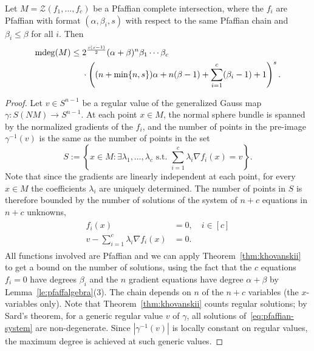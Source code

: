 \begin{proposition}\label{prop:pfaffian-degree-bound}
  Let $M=\mathcal{Z}(f_1,\dots,f_c)$ be a Pfaffian complete intersection, where the $f_i$ are Pfaffian with format $(\alpha, \beta_i, s)$ with respect to the same Pfaffian chain and $\beta_i\le \beta$ for all $i$. Then
  \begin{align*}
    \operatorname{\mathrm{mdeg}}(M) \le{} & 2^{\frac{s(s-1)}{2}}(\alpha+\beta)^n\beta_1\cdots \beta_c \\
    &\cdot \left((n+\min\{n,s\})\alpha+n(\beta-1)+\sum_{i=1}^c(\beta_i-1)+1\right)^s.
  \end{align*}
  \end{proposition}
  
  \begin{proof}
  Let $v\in S^{n-1}$ be a regular value of the generalized Gauss map $\gamma\colon S(NM)\to S^{n-1}$. At each point $x\in M$,
  the normal sphere bundle is spanned by the normalized gradients of the $f_i$, and the number of points in the pre-image $\gamma^{-1}(v)$ is the same as the number of points in the set
  \begin{equation*}
    S:= \left\{x\in M \colon \exists \lambda_1,\dots,\lambda_c \text{ s.t. } \sum_{i=1}^c \lambda_i \nabla f_i(x) = v\right\}.
  \end{equation*}
  Note that since the gradients are linearly independent at each point, for every $x\in M$ the coefficients $\lambda_i$ are uniquely determined. The number of points in $S$ is therefore bounded by the number of solutions of the system of $n+c$ equations in $n+c$ unknowns,
  \begin{align}
    \label{eq:pfaffian-system}
  \begin{split}
    f_i(x) &= 0, \quad i\in [c]\\
    v-\sum_{i=1}^c \lambda_i \nabla f_i(x) &= 0.
  \end{split}
  \end{align}
  All functions involved are Pfaffian and we can apply Theorem~\ref{thm:khovanskii} to get a bound on the number of solutions, using the fact that the $c$ equations $f_i=0$ have degrees $\beta_i$ and the $n$ gradient equations have degree $\alpha+\beta$ by Lemma~\ref{le:pfaffalgebra}(3). The chain depends on $n$ of the $n+c$ variables (the $x$-variables only). Note that Theorem~\ref{thm:khovanskii} counts regular solutions; by Sard's theorem, for a generic regular value $v$ of $\gamma$, all solutions of~\eqref{eq:pfaffian-system} are non-degenerate. Since $|\gamma^{-1}(v)|$ is locally constant on regular values, the maximum degree is achieved at such generic values.
  \end{proof}


